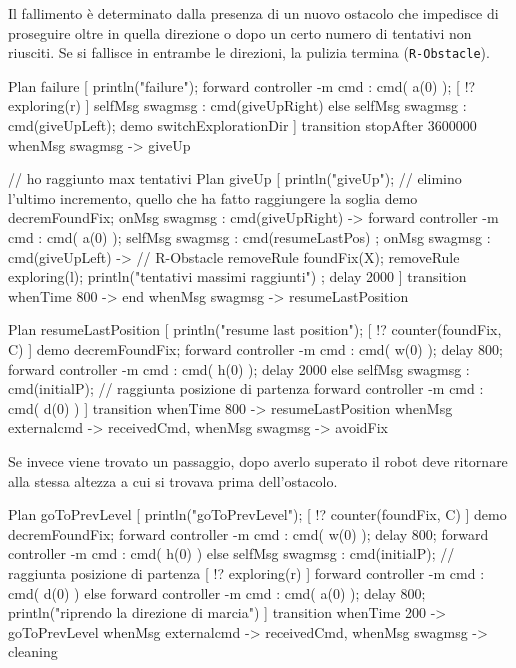 \documentclass{../llncs}
\newcommand{\code}[1]{{\color{blue}\small{\texttt{#1}}}}
\begin{document}
Il fallimento è determinato dalla presenza di un nuovo ostacolo che impedisce di proseguire oltre in quella direzione o dopo un certo numero di tentativi non riusciti. Se si fallisce in entrambe le direzioni, la pulizia termina (\code{R-Obstacle}).\\

\begin{qacode}[caption={SoftwareAgent, pt8}]
Plan failure [
	println("failure");
	forward controller -m cmd : cmd( a(0) );
	[ !? exploring(r) ] selfMsg swagmsg : cmd(giveUpRight)
	else selfMsg swagmsg : cmd(giveUpLeft);
	demo switchExplorationDir
]
transition stopAfter 3600000
	whenMsg swagmsg -> giveUp

// ho raggiunto max tentativi
Plan giveUp [
	println("giveUp");
	// elimino l'ultimo incremento, quello che ha fatto raggiungere la soglia
	demo decremFoundFix;
	onMsg swagmsg : cmd(giveUpRight) -> {
		forward controller -m cmd : cmd( a(0) );
		selfMsg swagmsg : cmd(resumeLastPos)
	};
	onMsg swagmsg : cmd(giveUpLeft) -> { // R-Obstacle
		removeRule foundFix(X);
		removeRule exploring(l);
		println("tentativi massimi raggiunti")
	};
	delay 2000
]
transition
	whenTime 800 -> end
	whenMsg swagmsg -> resumeLastPosition
	
Plan resumeLastPosition [
	println("resume last position");
	[ !? counter(foundFix, C) ] {
		demo decremFoundFix;
		forward controller -m cmd : cmd( w(0) );
		delay 800;
		forward controller -m cmd : cmd( h(0) );
		delay 2000
	}
	else {
		selfMsg swagmsg : cmd(initialP); // raggiunta posizione di partenza
		forward controller -m cmd : cmd( d(0) )
	}
]
transition whenTime 800 -> resumeLastPosition
	whenMsg externalcmd -> receivedCmd,
	whenMsg swagmsg -> avoidFix
\end{qacode}

Se invece viene trovato un passaggio, dopo averlo superato il robot deve ritornare alla stessa altezza a cui si trovava prima dell'ostacolo.\\

\begin{qacode}[caption={SoftwareAgent, pt9}]
Plan goToPrevLevel [
	println("goToPrevLevel");
	[ !? counter(foundFix, C) ] {
		demo decremFoundFix;
		forward controller -m cmd : cmd( w(0) );
		delay 800;
		forward controller -m cmd : cmd( h(0) )
	}
	else {
		selfMsg swagmsg : cmd(initialP); // raggiunta posizione di partenza
		[ !? exploring(r) ] forward controller -m cmd : cmd( d(0) )
		else forward controller -m cmd : cmd( a(0) );
		delay 800;
		println("riprendo la direzione di marcia")
	}
]
transition whenTime 200 -> goToPrevLevel
	whenMsg externalcmd -> receivedCmd,
	whenMsg swagmsg -> cleaning
\end{qacode}
\end{document}
